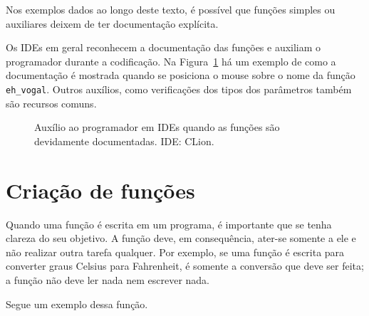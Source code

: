 \documentclass[
  11pt,
  a4paper,
]{scrbook}
\begin{document}
Nos exemplos dados ao longo deste texto, é possível que funções simples
ou auxiliares deixem de ter documentação explícita.

Os IDEs em geral reconhecem a documentação das funções e auxiliam o
programador durante a codificação. Na Figura~\ref{fig-ide-popup-funcao}
há um exemplo de como a documentação é mostrada quando se posiciona o
mouse sobre o nome da função \texttt{eh\_vogal}. Outros auxílios, como
verificações dos tipos dos parâmetros também são recursos comuns.

\begin{figure}[tb]

\caption{\label{fig-ide-popup-funcao}Auxílio ao programador em IDEs
quando as funções são devidamente documentadas. IDE: CLion.}


\end{figure}%

\section{Criação de funções}\label{criauxe7uxe3o-de-funuxe7uxf5es}

Quando uma função é escrita em um programa, é importante que se tenha
clareza do seu objetivo. A função deve, em consequência, ater-se somente
a ele e não realizar outra tarefa qualquer. Por exemplo, se uma função é
escrita para converter graus Celsius para Fahrenheit, é somente a
conversão que deve ser feita; a função não deve ler nada nem escrever
nada.

Segue um exemplo dessa função.
\end{document}
